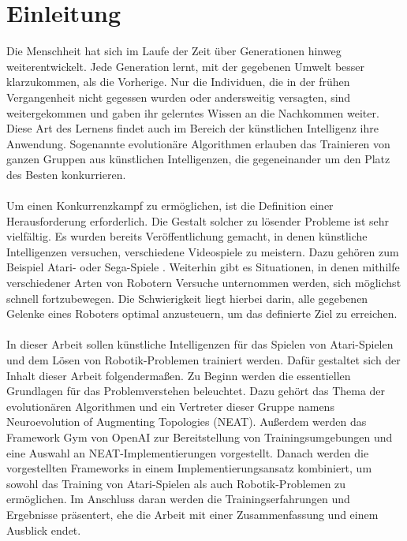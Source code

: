 
\chapter{Einleitung}
\label{ch:Introduction}
Die Menschheit hat sich im Laufe der Zeit über Generationen hinweg weiterentwickelt. Jede Generation lernt, mit der gegebenen Umwelt besser klarzukommen, als die Vorherige. Nur die Individuen, die in der frühen Vergangenheit nicht gegessen wurden oder andersweitig versagten, sind weitergekommen und gaben ihr gelerntes Wissen an die Nachkommen weiter. Diese Art des Lernens findet auch im Bereich der künstlichen Intelligenz ihre Anwendung. Sogenannte evolutionäre Algorithmen erlauben das Trainieren von ganzen Gruppen aus künstlichen Intelligenzen, die gegeneinander um den Platz des Besten konkurrieren.
\\
\\
Um einen Konkurrenzkampf zu ermöglichen, ist die Definition einer Herausforderung erforderlich. Die Gestalt solcher zu lösender Probleme ist sehr vielfältig. Es wurden bereits Veröffentlichung gemacht, in denen künstliche Intelligenzen versuchen, verschiedene Videospiele zu meistern. Dazu gehören zum Beispiel Atari- \cite{stanley2002} oder Sega-Spiele \cite{gupta2019}. Weiterhin gibt es Situationen, in denen mithilfe verschiedener Arten von Robotern Versuche unternommen werden, sich möglichst schnell fortzubewegen. Die Schwierigkeit liegt hierbei darin, alle gegebenen Gelenke eines Roboters optimal anzusteuern, um das definierte Ziel zu erreichen.
\\
\\
In dieser Arbeit sollen künstliche Intelligenzen für das Spielen von Atari-Spielen und dem Lösen von Robotik-Problemen trainiert werden. Dafür gestaltet sich der Inhalt dieser Arbeit folgendermaßen. Zu Beginn werden die essentiellen Grundlagen für das Problemverstehen beleuchtet. Dazu gehört das Thema der evolutionären Algorithmen und ein Vertreter dieser Gruppe namens Neuroevolution of Augmenting Topologies (NEAT). Außerdem werden das Framework Gym von OpenAI zur Bereitstellung von Trainingsumgebungen und eine Auswahl an NEAT-Implementierungen vorgestellt. Danach werden die vorgestellten Frameworks in einem Implementierungsansatz kombiniert, um sowohl das Training von Atari-Spielen als auch Robotik-Problemen zu ermöglichen. Im Anschluss daran werden die Trainingserfahrungen und Ergebnisse präsentert, ehe die Arbeit mit einer Zusammenfassung und einem Ausblick endet.
